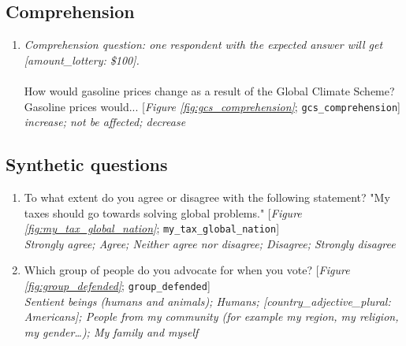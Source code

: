  \subsection*{Comprehension} 
 \begin{enumerate}[resume] 
\item  \label{q:gcs_comprehension} \textit{Comprehension question: one respondent with the expected answer will get [amount\_lottery: \$100].}\\\\How would gasoline prices change as a result of the Global Climate Scheme? \\Gasoline prices would... [\textit{Figure \ref{fig:gcs_comprehension}}; 
\verb|gcs_comprehension|]
  \\ \textit{increase; not be affected; decrease}

\end{enumerate} 

 \subsection*{Synthetic questions} 
 \begin{enumerate}[resume] 
\item  \label{q:my_tax_global_nation} To what extent do you agree or disagree with the following statement? "My taxes should go towards solving global problems." [\textit{Figure \ref{fig:my_tax_global_nation}}; 
\verb|my_tax_global_nation|]
  \\ \textit{Strongly agree; Agree; Neither agree nor disagree; Disagree; Strongly disagree}

\item  \label{q:group_defended} Which group of people do you advocate for when you vote? [\textit{Figure \ref{fig:group_defended}}; 
\verb|group_defended|]
  \\ \textit{Sentient beings (humans and animals); Humans; [country\_adjective\_plural: Americans]; People from my community (for example my region, my religion, my gender…); My family and myself}

\end{enumerate} 

